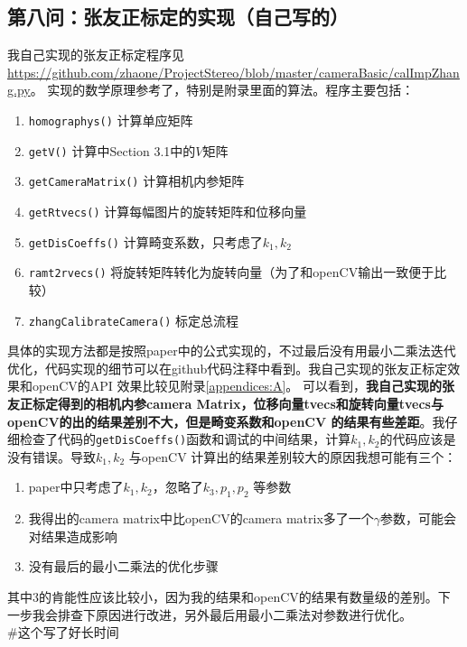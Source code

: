 \documentclass[UTF8]{ctexart}
\begin{document}
\subsection{第八问：张友正标定的实现（自己写的）}
我自己实现的张友正标定程序见\url{https://github.com/zhaone/ProjectStereo/blob/master/cameraBasic/calImpZhang.py}。 实现的数学原理参考了\cite{zhang2000flexible}，特别是附录里面的算法。程序主要包括：
\begin{enumerate}
  \item \verb"homographys()" 计算单应矩阵
  \item \verb"getV()" 计算\cite{zhang2000flexible}中Section 3.1中的$V$矩阵
  \item \verb"getCameraMatrix()" 计算相机内参矩阵
  \item \verb"getRtvecs()" 计算每幅图片的旋转矩阵和位移向量
  \item \verb"getDisCoeffs()" 计算畸变系数，只考虑了$k_1,k_2$
  \item \verb"ramt2rvecs()" 将旋转矩阵转化为旋转向量（为了和openCV输出一致便于比较）
  \item \verb"zhangCalibrateCamera()" 标定总流程
\end{enumerate}
具体的实现方法都是按照paper\cite{zhang2000flexible}中的公式实现的，不过最后没有用最小二乘法迭代优化，代码实现的细节可以在github代码注释中看到。我自己实现的张友正标定效果和openCV的API 效果比较见附录\ref{appendices:A}。 可以看到，\textbf{我自己实现的张友正标定得到的相机内参camera Matrix，位移向量tvecs和旋转向量tvecs与openCV的出的结果差别不大，但是畸变系数和openCV 的结果有些差距}。我仔细检查了代码的\verb"getDisCoeffs()"函数和调试的中间结果，计算$k_1,k_2$的代码应该是没有错误。导致$k_1,k_2$ 与openCV 计算出的结果差别较大的原因我想可能有三个：
\begin{enumerate}
  \item paper\cite{zhang2000flexible}中只考虑了$k_1,k_2$，忽略了$k_3,p_1,p_2$ 等参数
  \item 我得出的camera matrix中比openCV的camera matrix多了一个$\gamma$参数，可能会对结果造成影响
  \item 没有最后的最小二乘法的优化步骤
\end{enumerate}
其中3的肯能性应该比较小，因为我的结果和openCV的结果有数量级的差别。下一步我会排查下原因进行改进，另外最后用最小二乘法对参数进行优化。\\
\#这个写了好长时间
\end{document}
